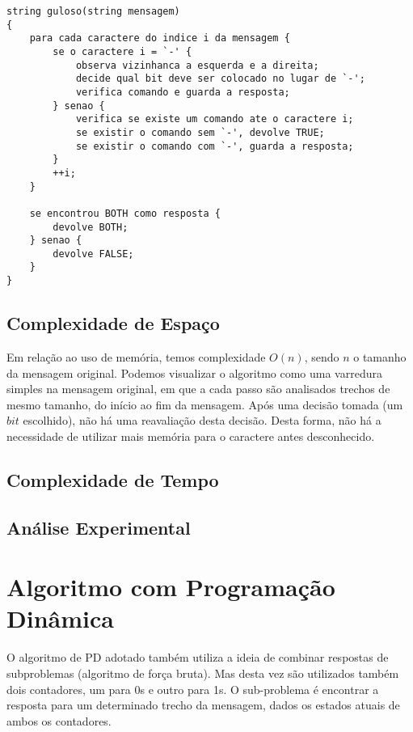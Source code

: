 \documentclass[a4paper,12pt,titlepage]{article}
\begin{document}
\newpage

\begin{lstlisting}[caption=Algoritmo Guloso]
string guloso(string mensagem)
{
    para cada caractere do indice i da mensagem {
        se o caractere i = `-' {
            observa vizinhanca a esquerda e a direita;
            decide qual bit deve ser colocado no lugar de `-';
            verifica comando e guarda a resposta;
        } senao {
            verifica se existe um comando ate o caractere i;
            se existir o comando sem `-', devolve TRUE;
            se existir o comando com `-', guarda a resposta;
        }
        ++i;
    }
    
    se encontrou BOTH como resposta {
        devolve BOTH;
    } senao {
        devolve FALSE;
    }
}
\end{lstlisting}

\subsection{Complexidade de Espaço}

Em relação ao uso de memória, temos complexidade $O(n)$, sendo $n$ o tamanho da mensagem original. Podemos visualizar o algoritmo como uma varredura simples na mensagem original, em que a cada passo são analisados trechos de mesmo tamanho, do início ao fim da mensagem. Após uma decisão tomada (um $bit$ escolhido), não há uma reavaliação desta decisão. Desta forma, não há a necessidade de utilizar mais memória para o caractere antes desconhecido.

\subsection{Complexidade de Tempo}
\subsection{Análise Experimental}

\section{Algoritmo com Programação Dinâmica}

O algoritmo de PD adotado também utiliza a ideia de combinar respostas de subproblemas (algoritmo de força bruta). Mas desta vez são utilizados também dois contadores, um para 0s e outro para 1s. O sub-problema é encontrar a resposta para um determinado trecho da mensagem, dados os estados atuais de ambos os contadores. 
\end{document}
